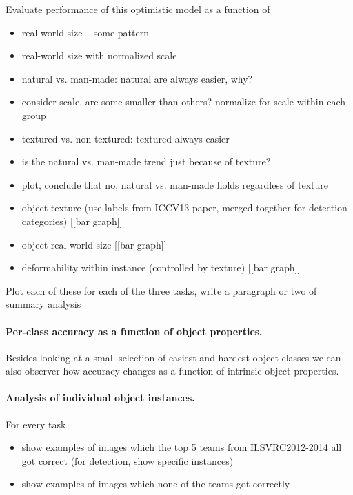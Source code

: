 Evaluate performance of this optimistic model as a function of 
\begin{itemize}
\item real-world size -- some pattern
\item real-world size with normalized scale

\item natural vs. man-made: natural are always easier, why?
\item consider scale, are some smaller than others? normalize for scale within each group
\item textured vs. non-textured: textured always easier
\item is the natural vs. man-made trend just because of texture?
\item plot, conclude that no, natural vs. man-made holds regardless of texture
\item object texture (use labels from ICCV13 paper, merged together for detection categories) [[bar graph]]
\item object real-world size [[bar graph]]
\item deformability within instance (controlled by texture) [[bar graph]]
\end{itemize}
Plot each of these for each of the three tasks, write a paragraph or two of summary analysis


\paragraph{Per-class accuracy as a function of object properties.}
Besides looking at a small selection of easiest and hardest object classes we can also observer how
accuracy changes as a function of intrinsic object properties. 

\fi

\iffalse



\paragraph{Analysis of individual object instances.} 
For every task
\begin{itemize}
\item show examples of images which the top 5 teams from ILSVRC2012-2014 all got correct (for detection, show specific instances)
\item show examples of images which none of the teams got correctly
\end{itemize}

